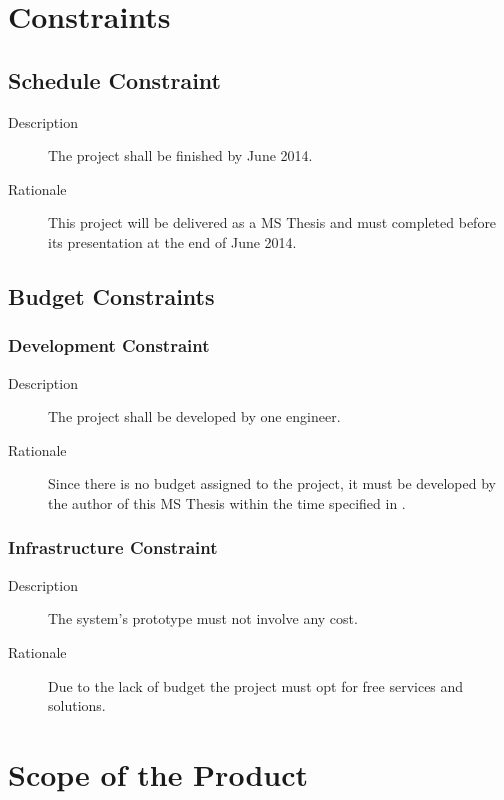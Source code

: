 \section{Constraints} \label{constraints}
\subsection{Schedule Constraint} \label{schedule_constraint}

\begin{description}
\item[Description] The project shall be finished by June 2014.
\item[Rationale] This project will be delivered as a MS Thesis and must completed before its presentation at the end of June 2014.
\end{description}

\subsection{Budget Constraints}

\subsubsection{Development Constraint}

\begin{description}
\item[Description] The project shall be developed by one engineer.
\item[Rationale] Since there is no budget assigned to the project, it must be developed by the author of this MS Thesis within the time specified in \label{schedule_constraint}.
\end{description}

\subsubsection{Infrastructure Constraint}

\begin{description}
\item[Description] The system's prototype must not involve any cost.
\item[Rationale] Due to the lack of budget the project must opt for free services and solutions.
\end{description}

\section{Scope of the Product}

